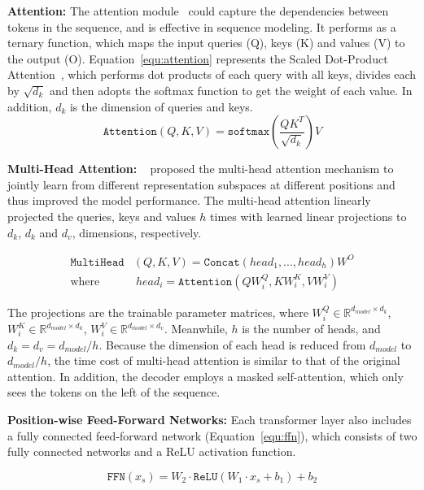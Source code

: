 \textbf{Attention:} The attention module~\cite{DBLP:conf/nips/VaswaniSPUJGKP17} could capture the dependencies between tokens in the sequence, and is effective in sequence modeling. It performs as a ternary function, which maps the input queries (Q), keys (K) and values (V) to the output (O). Equation~\ref{equ:attention} represents the Scaled Dot-Product Attention~\cite{DBLP:conf/nips/VaswaniSPUJGKP17}, which performs dot products of each query with all keys, divides each by $\sqrt{d_k}$ and then adopts the softmax function to get the weight of each value. In addition, $d_k$ is the dimension of queries and keys.
\begin{equation}
    \texttt{Attention}(Q, K, V) = \texttt{softmax}(\frac{QK^T}{\sqrt{d_k}})V
\label{equ:attention}
\end{equation}

\textbf{Multi-Head Attention:} ~\citet{DBLP:conf/nips/VaswaniSPUJGKP17} proposed the multi-head attention mechanism to jointly learn from different representation subspaces at different positions and thus improved the model performance. The multi-head attention linearly projected the queries, keys and values $h$ times with learned linear projections to $d_k$, $d_k$ and $d_v$, dimensions, respectively. 

\begin{align}
    \texttt{MultiHead}&(Q, K, V) = \texttt{Concat}(head_1, ..., head_h){W^O} \\
    \text{where}&\ head_i = \texttt{Attention}(QW_{i}^Q, KW_{i}^K, VW_{i}^V) \nonumber
\label{equ:multi_head}  
\end{align}

\noindent The projections are the trainable parameter matrices, where $W_{i}^Q \in \mathbb{R}^{d_{model} \times d_k}$, $W_{i}^K \in \mathbb{R}^{d_{model} \times d_k}$, $W_{i}^V \in \mathbb{R}^{d_{model} \times d_v}$. Meanwhile, $h$ is the number of heads, and $d_k = d_v = d_{model}/h$. Because the dimension of each head is reduced from $d_{model}$ to $d_{model}/h$, the time cost of multi-head attention is similar to that of the original attention. In addition, the decoder employs a masked self-attention, which only sees the tokens on the left of the sequence.

\textbf{Position-wise Feed-Forward Networks:} Each transformer layer also includes a fully connected feed-forward network (Equation~\ref{equ:ffn}), which consists of two fully connected networks and a ReLU activation function.

\begin{equation}
    \texttt{FFN}(x_{s}) = W_{2} \cdot \texttt{ReLU}(W_{1} \cdot x_{s} + b_{1}) + b_{2}
\label{equ:ffn}
\end{equation}

